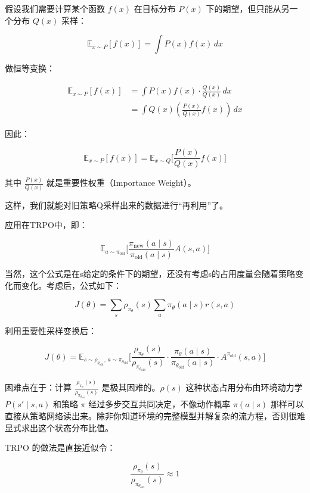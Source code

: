 假设我们需要计算某个函数 \(f(x)\) 在目标分布 \(P(x)\) 下的期望，但只能从另一个分布 \(Q(x)\) 采样：

\[
\mathbb{E}_{x\sim P}[f(x)] = \int P(x)f(x)\,dx
\]

做恒等变换：

\[
\begin{aligned}
\mathbb{E}_{x\sim P}[f(x)]
&= \int P(x)f(x)\cdot \frac{Q(x)}{Q(x)}\,dx \\
&= \int Q(x)(\frac{P(x)}{Q(x)}f(x))\,dx
\end{aligned}
\]

因此：

\[
\mathbb{E}_{x\sim P}[f(x)]
=
\mathbb{E}_{x\sim Q}
\bigl[
\frac{P(x)}{Q(x)}f(x)
\bigr]
\]

其中 \(\frac{P(x)}{Q(x)}\) 就是重要性权重（Importance Weight）。

这样，我们就能对旧策略Q采样出来的数据进行``再利用''了。

应用在TRPO中，即：

\[
\mathbb{E}_{a\sim\pi_{\mathrm{old}}}
\bigl[
\frac{\pi_{\mathrm{new}}(a\mid s)}{\pi_{\mathrm{old}}(a\mid s)}
A(s,a)
\bigr]
\]

当然，这个公式是在s给定的条件下的期望，还没有考虑s的占用度量会随着策略变化而变化。考虑后，公式如下：

\[
J(\theta)=
\sum_s\rho_{\pi_\theta}(s)
\sum_a\pi_\theta(a\mid s)r(s,a)
\]

利用重要性采样变换后：

\[
J(\theta)=
\mathbb{E}_{s\sim\rho_{\theta_{\mathrm{old}}},\,a\sim\pi_{\theta_{\mathrm{old}}}}
\bigl[
\frac{\rho_{\pi_\theta}(s)}{\rho_{\pi_{\theta_{\mathrm{old}}}}(s)}
\cdot
\frac{\pi_\theta(a\mid s)}{\pi_{\theta_{\mathrm{old}}}(a\mid s)}
\cdot
A^{\pi_{\mathrm{old}}}(s,a)
\bigr]
\]

困难点在于：计算 \(\frac{\rho_{\pi_\theta}(s)}{\rho_{\pi_{\theta_{\mathrm{old}}}}(s)}\) 是极其困难的。\(\rho(s)\) 这种状态占用分布由环境动力学 \(P(s'\mid s,a)\) 和策略 \(\pi\) 经过多步交互共同决定，不像动作概率 \(\pi(a\mid s)\) 那样可以直接从策略网络读出来。除非你知道环境的完整模型并解复杂的流方程，否则很难显式求出这个状态分布比值。

TRPO 的做法是直接近似令：

\[
\frac{\rho_{\pi_\theta}(s)}{\rho_{\pi_{\theta_{\mathrm{old}}}}(s)}\approx 1
\]

